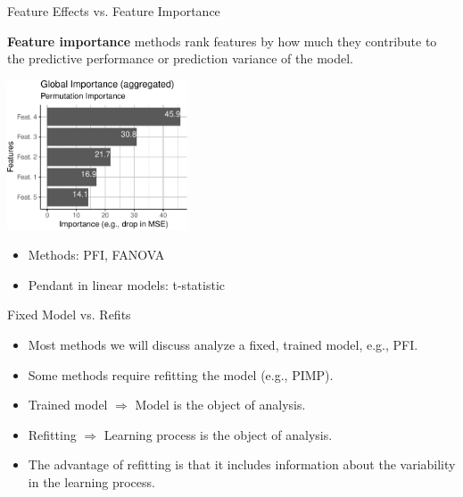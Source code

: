 \documentclass[11pt,compress,t,notes=noshow, aspectratio=169, xcolor=table]{beamer}
\begin{document}
\begin{vbframe}{Feature Effects vs. Feature Importance}
	
	\textbf{Feature importance} methods rank features by how much they contribute to the predictive performance or prediction variance of the model.
	\begin{center}
		\includegraphics[page=1, width=0.4\textwidth]{figure/feature-importance}
	\end{center}
	\begin{itemize}
		\itemsep1em
		\item Methods: PFI, FANOVA
		\item Pendant in linear models: t-statistic
	\end{itemize}

\end{vbframe}



\begin{vbframe}{Fixed Model vs. Refits}
	\begin{itemize}
		\itemsep2em
		\item Most methods we will discuss analyze a fixed, trained model, e.g., PFI.
		\item Some methods require refitting the model (e.g., PIMP).
		\item Trained model $\Rightarrow$ Model is the object of analysis.
		\item Refitting $\Rightarrow$ Learning process is the object of analysis.
		\item The advantage of refitting is that it includes information about the variability in the learning process.
	\end{itemize}
\end{vbframe}
\end{document}
